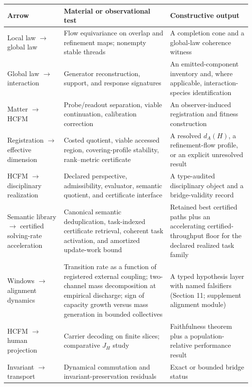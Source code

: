 \documentclass[11pt]{article}
\theoremstyle{definition}
\begin{document}
\begin{center}
\begin{tabular}{@{}p{}p{}p{}@{}}
\toprule
Arrow & Material or observational test & Constructive output\\
\midrule
Local law $\to$ global law & Flow equivariance on overlap and refinement maps; nonempty stable threads & A completion cone and a global-law coherence witness\\
Global law $\to$ interaction & Generator reconstruction, support, and response signatures & An emitted-component inventory and, where applicable, interaction-species identification\\
Matter $\to$ HCFM & Probe/readout separation, viable continuation, calibration correction & An observer-induced registration and fitness construction\\
Registration $\to$ effective dimension & Costed quotient, viable accessed region, covering-profile stability, rank--metric certificate & A resolved $d_A(H)$, a refinement-flow profile, or an explicit unresolved result\\
HCFM $\to$ disciplinary realization & Declared perspective, admissibility, evaluator, semantic quotient, and certificate interface & A type-audited disciplinary object and a bridge-validity record\\
Semantic library $\to$ certified solving-rate acceleration & Canonical semantic deduplication, task-indexed certificate retrieval, coherent task activation, and amortized update-work bound & Retained best certified paths plus an accelerating certified-throughput floor for the declared realized task family\\
Windows $\to$ alignment dynamics & Transition rate as a function of registered external coupling; two-channel mass decomposition at empirical discharge; sign of capacity growth versus mass generation in bounded collectives & A typed hypothesis layer with named falsifiers (Section 11; supplement alignment module)\\
HCFM $\to$ human projection & Carrier decoding on finite slices; comparative $J_H$ study & Faithfulness theorem plus a population-relative performance result\\
Invariant $\to$ transport & Dynamical commutation and invariant-preservation residuals & Exact or bounded bridge status\\
\bottomrule
\end{tabular}
\end{center}
\end{document}
